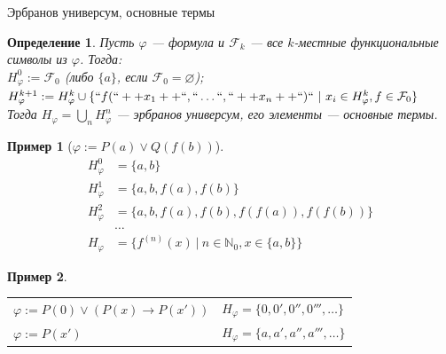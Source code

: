 \documentclass[aspectratio=169]{beamer}
\newtheorem{dfn}{Определение}[section]
\newtheorem{exm}{Пример}[section]
\begin{document}
\begin{frame}{Эрбранов универсум, основные термы}
\begin{dfn}Пусть $\varphi$ --- формула и $\mathcal{F}_k$ --- все $k$-местные функциональные символы из $\varphi$.
Тогда:\\
$H^0_\varphi := \mathcal{F}_0$ (либо $\{a\}$, если $\mathcal{F}_0 = \varnothing$);
$H^{k+1}_\varphi := H^k_\varphi \cup \{``f(``++x_1++``,``\dots``,``++x_n++``)``\ |\ x_i \in H^k_\varphi, f \in \mathcal{F}_0\}$\\

Тогда $H_\varphi = \bigcup_n H^n_\varphi$ --- эрбранов универсум, его элементы --- основные термы.
\end{dfn}

\begin{exm}[$\varphi := P(a)\vee Q(f(b))$]\vspace{-0.3cm}
$$\begin{array}{ll}
H^0_\varphi &= \{a,b\}\\
H^1_\varphi &= \{a,b,f(a),f(b)\}\\
H^2_\varphi &= \{a,b,f(a),f(b),f(f(a)),f(f(b))\}\\&\dots\\
H_\varphi &= \{f^{(n)}(x)\ |\ n \in \mathbb{N}_0, x \in \{a,b\}\}\end{array}$$
\end{exm}\vspace{-0.5cm}

\begin{exm}
\begin{tabular}{ll}
$\varphi := P(0)\vee (P(x)\rightarrow P(x'))$ & $H_\varphi = \{0, 0', 0'', 0''', \dots\}$ \\
$\varphi := P(x')$ & $H_\varphi =\{a,a',a'',a''',\dots\}$
\end{tabular}
\end{exm}
\end{frame}
\end{document}
